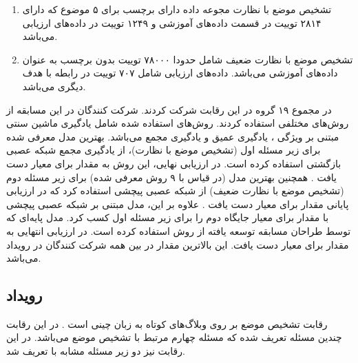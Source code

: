 \begin{enumerate}
	\item تشخیص موضع با نظارت
	\newline
	مجوعه داده دارای برچسب برای ۵ موضوع
	 که دارای ۲۸۱۴ توییت در قسمت دادە‌های آموزشی و
	۱۲۴۹ توییت در دادە‌های ارزیابی می‌باشد.
	\item تشخیص موضع با نظارت ضعیف
	\newline
	شامل حدودا ۷۸۰۰۰ توییت بدون برچسب به عنوان دادە‌های آموزشی می‌باشد. دادە‌های ارزیابی شامل ۷۰۷ توییت در رابطه با هدف دیگری می‌‌باشد.
\end{enumerate}

	در مجموع ۱۹ گروه در این رقابت شرکت کردند. شرکت کنندگان در این مسابقه از روش‌های مختلفی استفاده کردند. روش‌های استفاده شده شامل یادگیری ماشین سنتی مبتنی بر ویژگی
	، یادگیری عمیق و یادگیری مجمع
	می‌باشد. بهترین مدل معرفی شده برای زیر مسئله اول (تشخیص موضع با نظارت)، از	یادگیری مجمع شبکه عصبی بازگشتی 
استفاده کرده است. در ارزیابی نهایی، این روش به مقدار
برای معیار
دست یافت \cite{zarrella-marsh-2016-mitre}. همچنین بهترین مدل (در قیاس با ۹ روش معرفی شده) برای زیر مسئله دوم (تشخیص موضع با نظارت ضعیف) از شبکه عصبی پیچشی 
استفاده کرد که در ارزیابی پایانی مقدار
 برای معیار
 دست یافت \cite{wei-etal-2016-pkudblab}. علاوه بر این، مدل مبتنی بر شبکه عصبی پیچشی
 با مقدار
  برای معیار
جایگاه دوم را برای زیر مسئله اول کسب کرد. مدل پایە‌ای که توسط طراحان مسابقه توسعه یافته از روش 
استفاده کرده است. در ارزیابی انتهایی به مقدار
 برای معیار
دست یافت. این بالاترین مقدار در بین همه شرکت کنندگان در رویداد می‌باشد.
 
\subsection{رویداد
	}

رقابت
تشخیص موضع بر روی وبلاگ‌های کوتاه به زبان چینی است \cite{10.1007/978-3-319-50496-4_85}. در این
رقابت چندین مسئله تعریف شده که مسئله چهارم مرتبط با تشخیص موضع می‌باشد. در این رقابت نیز دو زیر مسئله مشابه با
 تعریف شد.
 
